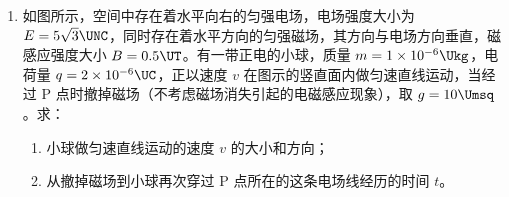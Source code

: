 \documentclass[\gkver]{gaokaozhenti}
\begin{document}
\begin{enumerate}
{$mgh + W = \frac{1}{2} m v_{C}^{2} - \frac{1}{2} m v_{B}^{2}$ ④

设运动员在 C 点所受的支持力为 $F_{N}$，由牛顿第二定律有 $F_{N}-mg=m\frac{v_{C}^{2}}{R}$ ⑤

由运动员能够承受的最大压力为其所受重力的 6 倍，联立④⑤式，代入数据解得 $R = 12.5\Um$ ⑥
}

\item
如图所示，空间中存在着水平向右的匀强电场，电场强度大小为 $E = 5\sqrt{3}\UNC$，同时存在着水平方向的匀强磁场，其方向与电场方向垂直，磁感应强度大小 $B = 0.5\UT$。有一带正电的小球，质量 $m = 1 \times 10^{-6}\Ukg$，电荷量 $q = 2 \times 10^{-6}\UC$，正以速度 $v$ 在图示的竖直面内做匀速直线运动，当经过 P 点时撤掉磁场（不考虑磁场消失引起的电磁感应现象），取 $g = 10\Umsq$。求：
\begin{enumerate}
	\item
	小球做匀速直线运动的速度 $v$ 的大小和方向；
	\item
	从撤掉磁场到小球再次穿过 P 点所在的这条电场线经历的时间 $t$。
\end{enumerate}

\end{enumerate}
\end{document}
